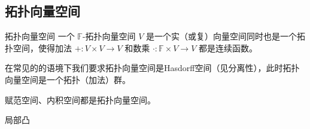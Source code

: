 

\subsection{拓扑向量空间}

\begin{definition}{拓扑向量空间}
一个 $\mathbb{F}$-拓扑向量空间 $V$ 是一个实（或复）向量空间同时也是一个拓扑空间，使得加法 $+: V \times V \to V$ 和数乘 $\cdot: \mathbb{F} \times V \to V$ 都是连续函数。

在常见的的语境下我们要求拓扑向量空间是Hasdorff空间（见分离性），此时拓扑向量空间是一个拓扑（加法）群。
\end{definition}

\begin{example}{}
赋范空间、内积空间都是拓扑向量空间。
\end{example}

\begin{definition}{局部凸}

\end{definition}


